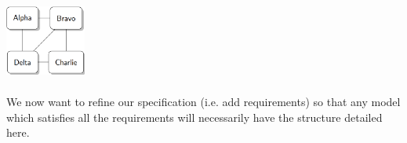 \documentclass{article}
\begin{document}
\begin{enumerate}[(a)]
        \begin{centering}\hspace*{1pt}\\\includegraphics[width=100px, height = 100px]{network2.png}\end{centering}
        We now want to refine our specification (i.e. add requirements) so that any model which satisfies all the requirements will necessarily have the structure detailed here.
        

\end{enumerate}
\end{document}
